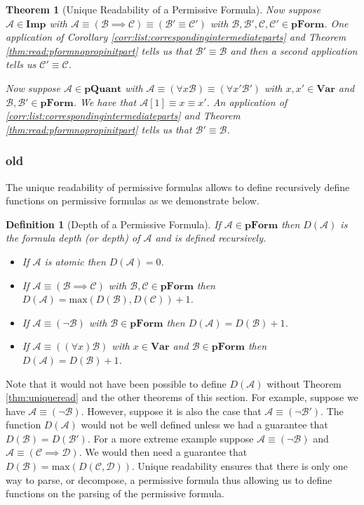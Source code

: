 \documentclass[12pt]{article}
\theoremstyle{break}
\newtheorem{definition}{Definition}[section]
\theoremstyle{break}
\newtheorem{theorem}{Theorem}[section]
\theoremstyle{break}
\theoremstyle{break}
\theoremstyle{break}
\newtheorem{informal definition}[definition]{Informal Definition}
\newcommand{\mc}[1]{\mathcal{#1}}
\begin{document}
\begin{theorem}[Unique Readability of a Permissive Formula]
Now suppose $\mc{A}\in\textbf{Imp}$ with $\mc{A}\equiv (\mc{B}\implies \mc{C})\equiv (\mc{B}'\equiv \mc{C}')$ with $\mc{B}, \mc{B}', \mc{C}, \mc{C}' \in \textbf{pForm}$.
One application of Corollary \ref{corr:list:correspondingintermediateparts} and Theorem \ref{thm:read:pformnopropinitpart} tells us that $\mc{B}'\equiv \mc{B}$ and then a second application tells us $\mc{C}'\equiv \mc{C}$.

Now suppose $\mc{A}\in\textbf{pQuant}$ with $\mc{A}\equiv (\forall x \mc{B}) \equiv (\forall x'\mc{B}')$ with $x, x' \in \textbf{Var}$ and $\mc{B}, \mc{B}'\in\textbf{pForm}$.
We have that $\mc{A}[1] \equiv x \equiv x'$.
An application of \ref{corr:list:correspondingintermediateparts} and Theorem \ref{thm:read:pformnopropinitpart} tells us that $\mc{B}'\equiv \mc{B}$.
\end{theorem}




\subsubsection{old}
The unique readability of permissive formulas allows to define recursively define functions on permissive formulas as we demonstrate below.

\begin{definition}[Depth of a Permissive Formula]
If $\mc{A}\in\textbf{pForm}$ then $D(\mc{A})$ is the formula depth (or depth) of $\mc{A}$ and is defined recursively.
\begin{itemize}
\item{If $\mc{A}$ is atomic then $D(\mc{A}) = 0$.}
\item{If $\mc{A} \equiv (\mc{B} \implies \mc{C})$ with $\mc{B}, \mc{C} \in \textbf{pForm}$ then $D(\mc{A}) = \text{max}(D(\mc{B}), D(\mc{C})) + 1$.}
\item{If $\mc{A} \equiv (\lnot \mc{B})$ with $\mc{B}\in\textbf{pForm}$ then $D(\mc{A}) = D(\mc{B}) + 1$.}
\item{If $\mc{A} \equiv ((\forall x) \mc{B})$ with $x\in\textbf{Var}$ and $\mc{B} \in \textbf{pForm}$ then $D(\mc{A}) = D(\mc{B}) + 1$.}
\end{itemize}
\end{definition}

Note that it would not have been possible to define $D(\mc{A})$ without Theorem \ref{thm:uniqueread} and the other theorems of this section.
For example, suppose we have $\mc{A} \equiv (\lnot \mc{B})$.
However, suppose it is also the case that $\mc{A} \equiv (\lnot \mc{B}')$.
The function $D(\mc{A})$ would not be well defined unless we had a guarantee that $D(\mc{B}) = D(\mc{B}')$.
For a more extreme example suppose $\mc{A} \equiv (\lnot \mc{B})$ and $\mc{A} \equiv (\mc{C} \implies \mc{D})$.
We would then need a guarantee that $D(\mc{B}) = \text{max}(D(\mc{C}, \mc{D}))$.
Unique readability ensures that there is only one way to parse, or decompose, a permissive formula thus allowing us to define functions on the parsing of the permissive formula.
\end{document}
